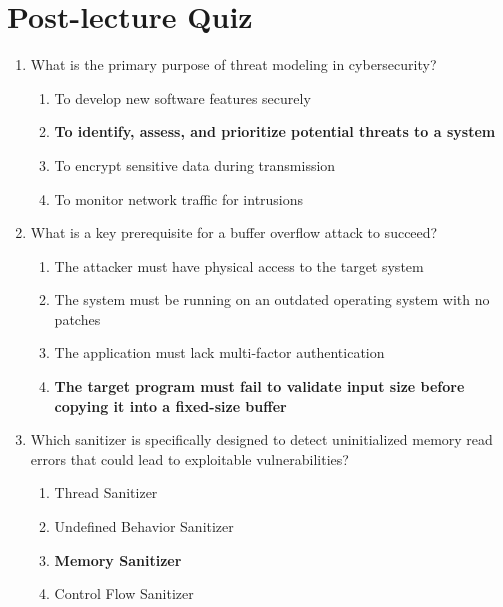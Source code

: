 \newpage

\section{Post-lecture Quiz}

\begin{enumerate}
    \item What is the primary purpose of threat modeling in cybersecurity?
    \begin{enumerate}
        \item To develop new software features securely
        \item \textbf{To identify, assess, and prioritize potential threats to a
              system}
        \item To encrypt sensitive data during transmission
        \item To monitor network traffic for intrusions
    \end{enumerate}

    \item What is a key prerequisite for a buffer overflow attack to succeed?
    \begin{enumerate}
        \item The attacker must have physical access to the target system
        \item The system must be running on an outdated operating system with no
              patches
        \item The application must lack multi-factor authentication
        \item \textbf{The target program must fail to validate input size before
              copying it into a fixed-size buffer}
    \end{enumerate}

    \item Which sanitizer is specifically designed to detect uninitialized
          memory read errors that could lead to exploitable vulnerabilities?
    \begin{enumerate}
        \item Thread Sanitizer
        \item Undefined Behavior Sanitizer
        \item \textbf{Memory Sanitizer}
        \item Control Flow Sanitizer
    \end{enumerate}


\end{enumerate}
